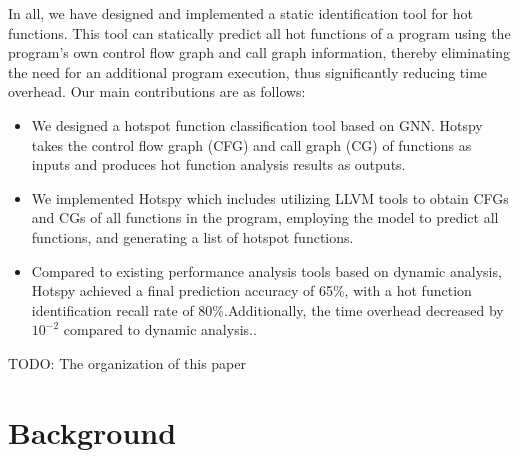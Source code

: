 \documentclass[lineno,sn-mathphys]{sn-jnl}%
\theoremstyle{thmstyleone}%
\theoremstyle{thmstyletwo}%
\theoremstyle{thmstylethree}%
\begin{document}
In all, we have designed and implemented a static identification tool for hot functions. This tool can statically predict all hot functions of a program using the program's own control flow graph and call graph information, thereby eliminating the need for an additional program execution, thus significantly reducing time overhead. Our main contributions are as follows:\par
\begin{itemize}
    \item We designed a hotspot function classification tool based on GNN. Hotspy takes the control flow graph (CFG) and call graph (CG) of functions as inputs and produces hot function analysis results as outputs.
    \item We implemented Hotspy which includes utilizing LLVM tools to obtain CFGs and CGs of all functions in the program, employing the model to predict all functions, and generating a list of hotspot functions.
    \item Compared to existing performance analysis tools based on dynamic analysis, Hotspy achieved a final prediction accuracy of 65\%, with a hot function identification recall rate of 80\%.Additionally, the time overhead decreased by $10^{-2}$ compared to dynamic analysis..
\end{itemize}

TODO: The organization of this paper

\section{Background}
\label{sec:background}
\end{document}

